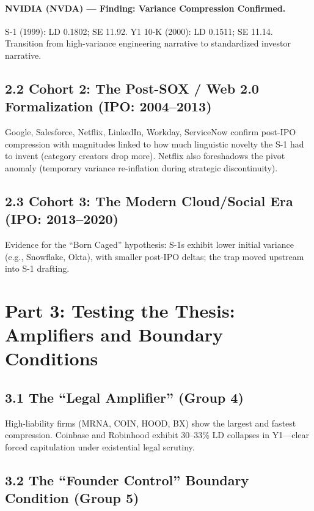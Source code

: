 \documentclass[12pt]{article}
\begin{document}
\paragraph{NVIDIA (NVDA) --- Finding: Variance Compression Confirmed.}
S-1 (1999): LD 0.1802; SE 11.92. Y1 10-K (2000): LD 0.1511; SE 11.14. Transition from high-variance engineering narrative to standardized investor narrative.

\subsection*{2.2 Cohort 2: The Post-SOX / Web 2.0 Formalization (IPO: 2004--2013)}

Google, Salesforce, Netflix, LinkedIn, Workday, ServiceNow confirm post-IPO compression with magnitudes linked to how much linguistic novelty the S-1 had to invent (category creators drop more). Netflix also foreshadows the pivot anomaly (temporary variance re-inflation during strategic discontinuity).

\subsection*{2.3 Cohort 3: The Modern Cloud/Social Era (IPO: 2013--2020)}

Evidence for the ``Born Caged'' hypothesis: S-1s exhibit lower initial variance (e.g., Snowflake, Okta), with smaller post-IPO deltas; the trap moved upstream into S-1 drafting.

\section*{Part 3: Testing the Thesis: Amplifiers and Boundary Conditions}

\subsection*{3.1 The ``Legal Amplifier'' (Group 4)}

High-liability firms (MRNA, COIN, HOOD, BX) show the largest and fastest compression. Coinbase and Robinhood exhibit 30--33\% LD collapses in Y1---clear forced capitulation under existential legal scrutiny.

\subsection*{3.2 The ``Founder Control'' Boundary Condition (Group 5)}
\end{document}
